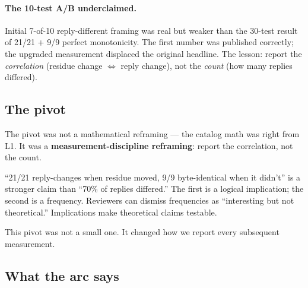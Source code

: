 \documentclass[11pt,letterpaper]{article}
\begin{document}
\paragraph{The 10-test A/B underclaimed.} Initial 7-of-10
reply-different framing was real but weaker than the 30-test result
of 21/21 + 9/9 perfect monotonicity. The first number was published
correctly; the upgraded measurement displaced the original headline.
The lesson: report the \emph{correlation} (residue change
$\Leftrightarrow$ reply change), not the \emph{count} (how many
replies differed).

\subsection{The pivot}

The pivot was not a mathematical reframing --- the catalog math was
right from L1. It was a \textbf{measurement-discipline reframing}:
report the correlation, not the count.

``21/21 reply-changes when residue moved, 9/9 byte-identical when it
didn't'' is a stronger claim than ``70\% of replies differed.'' The
first is a logical implication; the second is a frequency. Reviewers
can dismiss frequencies as ``interesting but not theoretical.''
Implications make theoretical claims testable.

This pivot was not a small one. It changed how we report every
subsequent measurement.

\subsection{What the arc says}
\end{document}
